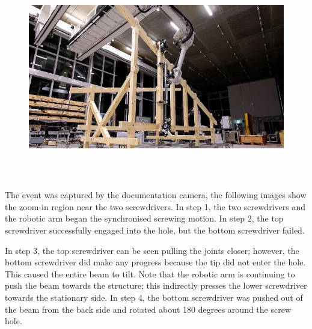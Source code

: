 \documentclass[11pt]{book}
\begin{document}
\begin{figure}[H]
\includegraphics[width=15.92cm,height=8.96cm]{./images/image101.jpeg}
\end{figure}


The event was captured by the documentation camera, the following images show the zoom-in region near the two screwdrivers. In step 1, the two screwdrivers and the robotic arm began the synchronised screwing motion. In step 2, the top screwdriver successfully engaged into the hole, but the bottom screwdriver failed. 

In step 3, the top screwdriver can be seen pulling the joints closer; however, the bottom screwdriver did make any progress because the tip did not enter the hole. This caused the entire beam to tilt. Note that the robotic arm is continuing to push the beam towards the structure; this indirectly presses the lower screwdriver towards the stationary side. In step 4, the bottom screwdriver was pushed out of the beam from the back side and rotated about 180 degrees around the screw hole. 
\end{document}
